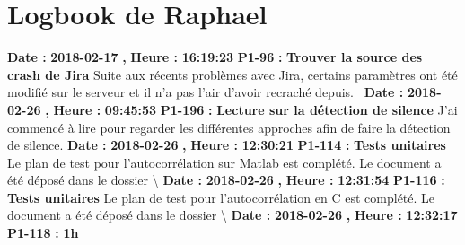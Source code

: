 \documentclass{article}%
\begin{document}
\section{Logbook de Raphael}%
\textbf{Date : }%
\textbf{2018{-}02{-}17}%
\textbf{,}%
\textbf{ Heure : }%
\textbf{16:19:23}%
\newline%
%
\textbf{P1{-}96 }%
\textbf{ : }%
\textbf{ Trouver la source des crash de Jira}%
\newline%
\newline%
%
Suite aux récents problèmes avec Jira, certains paramètres ont été modifié sur le serveur et il n'a pas l'air d'avoir recraché depuis.~\newline%
\newline%
%
\textbf{Date : }%
\textbf{2018{-}02{-}26}%
\textbf{,}%
\textbf{ Heure : }%
\textbf{09:45:53}%
\newline%
%
\textbf{P1{-}196 }%
\textbf{ : }%
\textbf{ Lecture sur la détection de silence}%
\newline%
\newline%
%
J'ai commencé à lire pour regarder les différentes approches afin de faire la détection de silence.\newline%
\newline%
%
\textbf{Date : }%
\textbf{2018{-}02{-}26}%
\textbf{,}%
\textbf{ Heure : }%
\textbf{12:30:21}%
\newline%
%
\textbf{P1{-}114 }%
\textbf{ : }%
\textbf{ Tests unitaires}%
\newline%
\newline%
%
Le plan de test pour l'autocorrélation sur Matlab est complété. Le document a été déposé dans le dossier \textbackslash{}\newline%
\newline%
%
\textbf{Date : }%
\textbf{2018{-}02{-}26}%
\textbf{,}%
\textbf{ Heure : }%
\textbf{12:31:54}%
\newline%
%
\textbf{P1{-}116 }%
\textbf{ : }%
\textbf{ Tests unitaires}%
\newline%
\newline%
%
Le plan de test pour l'autocorrélation en C est complété. Le document a été déposé dans le dossier \textbackslash{}\newline%
\newline%
%
\textbf{Date : }%
\textbf{2018{-}02{-}26}%
\textbf{,}%
\textbf{ Heure : }%
\textbf{12:32:17}%
\newline%
%
\textbf{P1{-}118 }%
\textbf{ : }%
\textbf{ 1h}%
\newline%
\newline%
\end{document}
